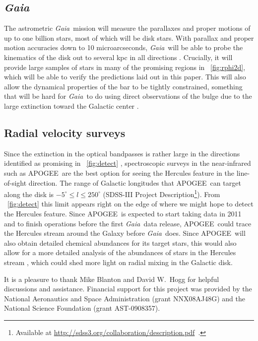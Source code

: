 \documentclass[12pt,preprint]{aastex}
\newcommand{\eg}{e.g.}
\newcommand{\Gaia}{\emph{Gaia}}
\newcommand{\apogee}{APOGEE}
\begin{document}
\subsection{\Gaia}

The astrometric \Gaia\ mission will measure the parallaxes and proper
motions of up to one billion stars, most of which will be disk
stars. With parallax and proper motion accuracies down to 10
microarcseconds, \Gaia\ will be able to probe the kinematics of the
disk out to several kpc in all directions
\citep{bailerjones08a}. Crucially, it will provide large samples of
stars in many of the promising regions in
\figurename~\ref{fig:rphi2d}, which will be able to verify the
predictions laid out in this paper. This will also allow the dynamical
properties of the bar to be tightly constrained, something that will
be hard for \Gaia\ to do using direct observations of the bulge due to
the large extinction toward the Galactic center \citep{robin05a}.



\subsection{Radial velocity surveys}

Since the extinction in the optical bandpasses is rather large in the
directions identified as promising in \figurename~\ref{fig:detect}
\citep[$A_V \approx 8$ mag toward $l \approx
270^{\circ}$;][]{marshall06a}, spectroscopic surveys in the
near-infrared such as \apogee\ are the best option for seeing the
Hercules feature in the line-of-sight direction. The range of Galactic
longitudes that \apogee\ can target along the disk is $-5^{\circ} \leq
l \leq 250^{\circ}$ (SDSS-III Project Description\footnote{Available
at \url{http://sdss3.org/collaboration/description.pdf}~.}). From
\figurename~\ref{fig:detect} this limit appears right on the edge of
where we might hope to detect the Hercules feature. Since \apogee\ is
expected to start taking data in 2011 and to finish operations before
the first \Gaia\ data release, \apogee\ could trace the Hercules
stream around the Galaxy before \Gaia\ does. Since \apogee\ will also
obtain detailed chemical abundances for its target stars, this would
also allow for a more detailed analysis of the abundances of stars in
the Hercules stream \citep[following, \eg,][]{Bensby07a,Bovy10a},
which could shed more light on radial mixing in the Galactic disk.

\acknowledgements It is a pleasure to thank Mike Blanton and David
W.~Hogg for helpful discussions and assistance.  Financial support for
this project was provided by the National Aeronautics and Space
Administration (grant NNX08AJ48G) and the National Science Foundation
(grant AST-0908357).
\end{document}

